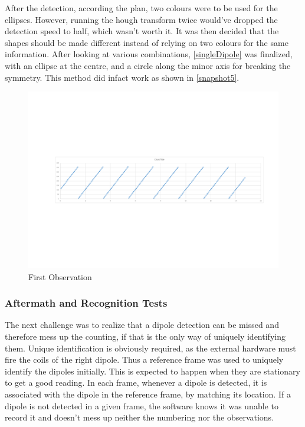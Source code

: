			After the detection, according the plan, two colours were to be used for the ellipses. However, running the hough transform twice would've dropped the detection speed to half, which wasn't worth it. It was then decided that the shapes should be made different instead of relying on two colours for the same information. After looking at various combinations, \autoref{singleDipole} was finalized, with an ellipse at the centre, and a circle along the minor axis for breaking the symmetry. This method did infact work as shown in \autoref{snapshot5}.
			\par

			\begin{figure}[bth]
				\begin{center}
					\includegraphics[width=1.1\linewidth]{../../latticeAnalyser/testGraphs}
				\end{center}
			\caption[First Observation]{First Observation}
			\label{testGraphs}
			\end{figure}
		\subsubsection{Aftermath and Recognition Tests}
			The next challenge was to realize that a dipole detection can be missed and therefore mess up the counting, if that is the only way of uniquely identifying them. Unique identification is obviously required, as the external hardware must fire the coils of the right dipole. Thus a reference frame was used to uniquely identify the dipoles initially. This is expected to happen when they are stationary to get a good reading. In each frame, whenever a dipole is detected, it is associated with the dipole in the reference frame, by matching its location. If a dipole is not detected in a given frame, the software knows it was unable to record it and doesn't mess up neither the numbering nor the observations.
			\par

